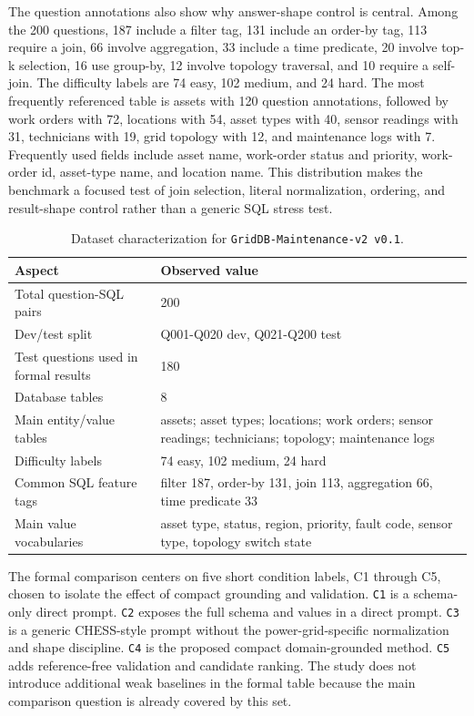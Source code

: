 \documentclass{ieeeaccess}
\begin{document}
The question annotations also show why answer-shape control is central. Among the 200 questions, 187 include a filter tag, 131 include an order-by tag, 113 require a join, 66 involve aggregation, 33 include a time predicate, 20 involve top-k selection, 16 use group-by, 12 involve topology traversal, and 10 require a self-join. The difficulty labels are 74 easy, 102 medium, and 24 hard. The most frequently referenced table is assets with 120 question annotations, followed by work orders with 72, locations with 54, asset types with 40, sensor readings with 31, technicians with 19, grid topology with 12, and maintenance logs with 7. Frequently used fields include asset name, work-order status and priority, work-order id, asset-type name, and location name. This distribution makes the benchmark a focused test of join selection, literal normalization, ordering, and result-shape control rather than a generic SQL stress test.

\begin{table}[t]
\caption{Dataset characterization for \texttt{GridDB-Maintenance-v2 v0.1}.}
\centering
\small
\begin{tabularx}{\textwidth}{lX}
\toprule
Aspect & Observed value \\
\midrule
Total question-SQL pairs & 200 \\
Dev/test split & Q001-Q020 dev, Q021-Q200 test \\
Test questions used in formal results & 180 \\
Database tables & 8 \\
Main entity/value tables & assets; asset types; locations; work orders; sensor readings; technicians; topology; maintenance logs \\
Difficulty labels & 74 easy, 102 medium, 24 hard \\
Common SQL feature tags & filter 187, order-by 131, join 113, aggregation 66, time predicate 33 \\
Main value vocabularies & asset type, status, region, priority, fault code, sensor type, topology switch state \\
\bottomrule
\end{tabularx}
\end{table}

The formal comparison centers on five short condition labels, C1 through C5, chosen to isolate the effect of compact grounding and validation. \texttt{C1} is a schema-only direct prompt. \texttt{C2} exposes the full schema and values in a direct prompt. \texttt{C3} is a generic CHESS-style prompt without the power-grid-specific normalization and shape discipline. \texttt{C4} is the proposed compact domain-grounded method. \texttt{C5} adds reference-free validation and candidate ranking. The study does not introduce additional weak baselines in the formal table because the main comparison question is already covered by this set.
\end{document}
